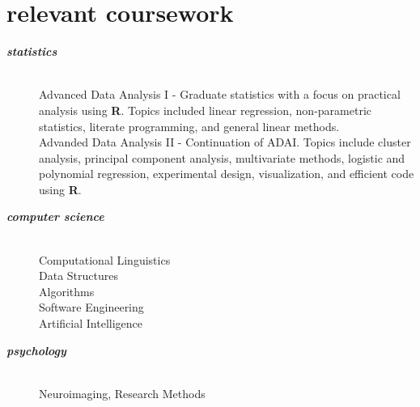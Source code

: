 \documentclass[]{friggeri-cv} %
\begin{document}
\section{relevant coursework}
\begin{description}
   \item[\textbf{\textit{statistics}}] \hfill \\
	 Advanced Data Analysis I - Graduate statistics with a focus on practical analysis using \textbf{R}. 
	 Topics included linear regression, non-parametric statistics, literate programming, and general linear methods. \hfill  \\
	 Advanded Data Analysis II - Continuation of ADAI.
	 Topics include cluster analysis, principal component analysis, multivariate methods, 
	 logistic and polynomial regression, experimental design, visualization, and efficient code using \textbf{R}.
   \item[\textbf{\textit{computer science}}] \hfill \\
	   Computational Linguistics \hfill \\
	   Data Structures\hfill \\
	   Algorithms \hfill \\
	   Software Engineering \hfill \\
	   Artificial Intelligence %
   \item[\textbf{\textit{psychology}}] \hfill \\  
	 Neuroimaging, Research Methods 
\end{description}

\end{document}
